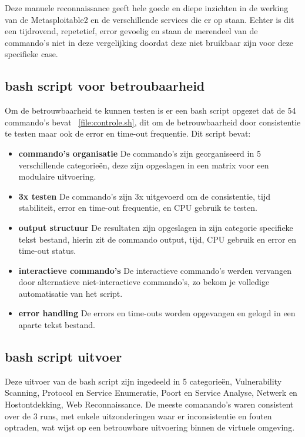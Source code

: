 Deze manuele reconnaissance geeft hele goede en diepe inzichten in de werking van de Metasploitable2 en de verschillende services die er op staan.
Echter is dit een tijdrovend, repetetief, error gevoelig en staan de merendeel van de commando's niet in deze vergelijking doordat deze niet bruikbaar zijn voor deze specifieke case.

\subsection{bash script voor betroubaarheid}

Om de betrouwbaarheid te kunnen testen is er een bash script opgezet dat de 54 commando's bevat ~\ref{file:controle.sh}, dit om de betrouwbaarheid door consistentie te testen maar ook de error en time-out frequentie.
Dit script bevat:

\begin{itemize}
  \item \textbf{commando's organisatie} De commando's zijn georganiseerd in 5 verschillende categorieën, deze zijn opgeslagen in een matrix voor een modulaire uitvoering.
  \item \textbf{3x testen} De commando's zijn 3x uitgevoerd om de consistentie, tijd stabiliteit, error en time-out frequentie, en CPU gebruik te testen.
  \item \textbf{output structuur} De resultaten zijn opgeslagen in zijn categorie specifieke tekst bestand, hierin zit de commando output, tijd, CPU gebruik en error en time-out status.
  \item \textbf{interactieve commando's} De interactieve commando's werden vervangen door alternatieve niet-interactieve commando's, zo bekom je volledige automatisatie van het script. 
  \item \textbf{error handling} De errors en time-outs worden opgevangen en gelogd in een aparte tekst bestand.

\end{itemize}

\subsection{bash script uitvoer}

Deze uitvoer van de bash script zijn ingedeeld in 5 categorieën, Vulnerability Scanning, Protocol en Service Enumeratie, Poort en Service Analyse, Netwerk en Hostontdekking, Web Reconnaissance.
De meeste comanando's waren consistent over de 3 runs, met enkele uitzonderingen waar er inconsistentie en fouten optraden, wat wijst op een betrouwbare uitvoering binnen de virtuele omgeving.

